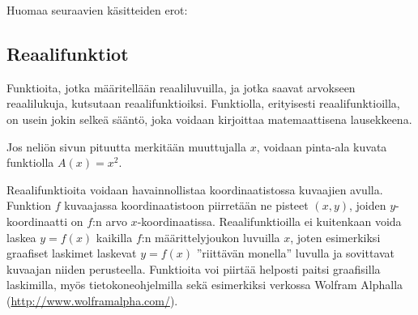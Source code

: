Huomaa seuraavien käsitteiden erot:

\subsection*{Reaalifunktiot}

Funktioita, jotka määritellään reaaliluvuilla, ja jotka saavat arvokseen reaalilukuja, kutsutaan reaalifunktioiksi.
Funktiolla, erityisesti reaalifunktioilla, on usein jokin selkeä sääntö, joka voidaan kirjoittaa matemaattisena lausekkeena.

\begin{esimerkki}
	Jos neliön sivun pituutta merkitään muuttujalla $x$, voidaan pinta-ala kuvata funktiolla $A(x) = x^2$.
\end{esimerkki} 

Reaalifunktioita voidaan havainnollistaa koordinaatistossa kuvaajien avulla.
Funktion $f$ kuvaajassa koordinaatistoon piirretään ne pisteet $(x, y)$, joiden $y$-koordinaatti on $f$:n arvo $x$-koordinaatissa.
Reaalifunktioilla ei kuitenkaan voida laskea $y = f(x)$ kaikilla $f$:n määrittelyjoukon luvuilla $x$, joten esimerkiksi graafiset laskimet
laskevat $y = f(x)$ ''riittävän monella'' luvulla ja sovittavat kuvaajan niiden perusteella.
Funktioita voi piirtää helposti paitsi graafisilla laskimilla, myös tietokoneohjelmilla sekä esimerkiksi verkossa
Wolfram Alphalla (\url{http://www.wolframalpha.com/}).

\def\vcent#1{\mathsurround0pt$\vcenter{\hbox{#1}}$}

